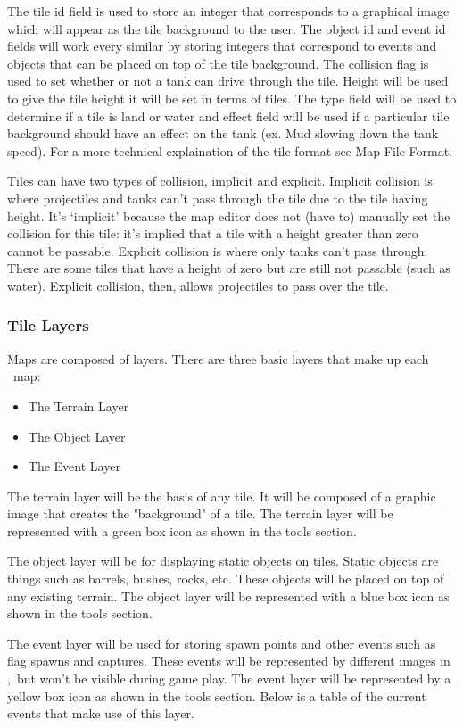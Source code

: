 The tile id field is used to store an integer that corresponds to a graphical image which will appear as the tile background to the user. The object id and event id fields will work every similar by storing integers that correspond to events and objects that can be placed on top of the tile background. The collision flag is used to set whether or not a tank can drive through the tile. Height will be used to give the tile height it will be set in terms of tiles. The type field will be used to determine if a tile is land or water and effect field will be used if a particular tile background should have an effect on the tank (ex. Mud slowing down the tank speed). For a more technical explaination of the tile format see Map File Format.

Tiles can have two types of collision, implicit and explicit. Implicit collision is where projectiles and tanks can't pass through the tile due to the tile having height. It's `implicit' because the map editor does not (have to) manually set the collision for this tile: it's implied that a tile with a height greater than zero cannot be passable. Explicit collision is where only tanks can't pass through. There are some tiles that have a height of zero but are still not passable (such as water). Explicit collision, then, allows projectiles to pass over the tile.

\subsubsection{Tile Layers}

Maps are composed of layers. There are three basic layers that make up each \VTank\ map:
\begin{itemize}
\item The Terrain Layer
\item The Object Layer
\item The Event Layer
\end{itemize}
The terrain layer will be the basis of any tile. It will be composed of a graphic image that creates the "background" of a tile. The terrain layer will be represented with a green box icon as shown in the tools section.

The object layer will be for displaying static objects on tiles. Static objects are things such as barrels, bushes, rocks, etc. These objects will be placed on top of any existing terrain. The object layer will be represented with a blue box icon as shown in the tools section.

The event layer will be used for storing spawn points and other events such as flag spawns and captures. These events will be represented by different images in \MapEditor,\ but won't be visible during game play. The event layer will be represented by a yellow box icon as shown in the tools section. Below is a table of the current events that make use of this layer.

